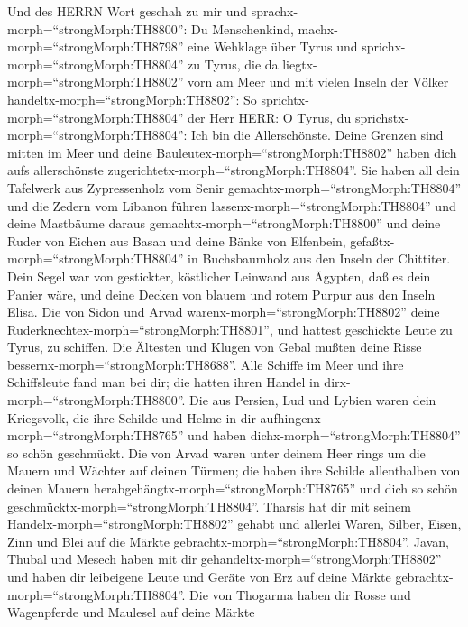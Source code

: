  Und des HERRN Wort geschah zu mir und
sprachx-morph=``strongMorph:TH8800'':  Du Menschenkind,
machx-morph=``strongMorph:TH8798'' eine Wehklage über Tyrus 
und sprichx-morph=``strongMorph:TH8804'' zu Tyrus, die da
liegtx-morph=``strongMorph:TH8802'' vorn am Meer und mit vielen Inseln
der Völker handeltx-morph=``strongMorph:TH8802'': So
sprichtx-morph=``strongMorph:TH8804'' der Herr HERR: O Tyrus, du
sprichstx-morph=``strongMorph:TH8804'': Ich bin die Allerschönste.
 Deine Grenzen sind mitten im Meer und deine
Bauleutex-morph=``strongMorph:TH8802'' haben dich aufs allerschönste
zugerichtetx-morph=``strongMorph:TH8804''.  Sie haben all
dein Tafelwerk aus Zypressenholz vom Senir
gemachtx-morph=``strongMorph:TH8804'' und die Zedern vom Libanon führen
lassenx-morph=``strongMorph:TH8804'' und deine Mastbäume daraus
gemachtx-morph=``strongMorph:TH8800''  und deine Ruder von
Eichen aus Basan und deine Bänke von Elfenbein,
gefaßtx-morph=``strongMorph:TH8804'' in Buchsbaumholz aus den Inseln der
Chittiter.  Dein Segel war von gestickter, köstlicher
Leinwand aus Ägypten, daß es dein Panier wäre, und deine Decken von
blauem und rotem Purpur aus den Inseln Elisa.  Die von Sidon
und Arvad warenx-morph=``strongMorph:TH8802'' deine
Ruderknechtex-morph=``strongMorph:TH8801'', und hattest geschickte Leute
zu Tyrus, zu schiffen.  Die Ältesten und Klugen von Gebal
mußten deine Risse bessernx-morph=``strongMorph:TH8688''. Alle Schiffe
im Meer und ihre Schiffsleute fand man bei dir; die hatten ihren Handel
in dirx-morph=``strongMorph:TH8800''.  Die aus Persien, Lud
und Lybien waren dein Kriegsvolk, die ihre Schilde und Helme in dir
aufhingenx-morph=``strongMorph:TH8765'' und haben
dichx-morph=``strongMorph:TH8804'' so schön geschmückt. 
Die von Arvad waren unter deinem Heer rings um die Mauern und Wächter
auf deinen Türmen; die haben ihre Schilde allenthalben von deinen Mauern
herabgehängtx-morph=``strongMorph:TH8765'' und dich so schön
geschmücktx-morph=``strongMorph:TH8804''.  Tharsis hat dir
mit seinem Handelx-morph=``strongMorph:TH8802'' gehabt und allerlei
Waren, Silber, Eisen, Zinn und Blei auf die Märkte
gebrachtx-morph=``strongMorph:TH8804''.  Javan, Thubal und
Mesech haben mit dir gehandeltx-morph=``strongMorph:TH8802'' und haben
dir leibeigene Leute und Geräte von Erz auf deine Märkte
gebrachtx-morph=``strongMorph:TH8804''.  Die von Thogarma
haben dir Rosse und Wagenpferde und Maulesel auf deine Märkte
